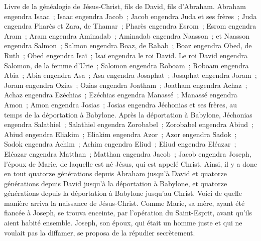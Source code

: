 \begin{multicols}{2}
\VerseOne{}Livre de la généalogie de Jésus-Christ, fils de David, fils d'Abraham.
Abraham engendra Isaac~; Isaac engendra Jacob~; Jacob engendra Juda et ses frères~;
Juda engendra Pharès et Zara, de Thamar~; Pharès engendra Esrom~; Esrom engendra Aram~;
Aram engendra Aminadab~; Aminadab engendra Naasson~; et Naasson engendra Salmon~;
Salmon engendra Boaz, de Rahab~; Boaz engendra Obed, de Ruth~; Obed engendra Isaï~;
Isaï engendra le roi David. Le roi David engendra Salomon, de la femme d'Urie~;
Salomon engendra Roboam~; Roboam engendra Abia~; Abia engendra Asa~;
Asa engendra Josaphat~; Josaphat engendra Joram~; Joram engendra Ozias~;
Ozias engendra Joatham~; Joatham engendra Achaz~; Achaz engendra Ezéchias~;
Ezéchias engendra Manassé~; Manassé engendra Amon~; Amon engendra Josias~;
Josias engendra Jéchonias et ses frères, au temps de la déportation à Babylone.
Après la déportation à Babylone, Jéchonias engendra Salathiel~; Salathiel engendra Zorobabel~;
Zorobabel engendra Abiud~; Abiud engendra Eliakim~; Eliakim engendra Azor~;
Azor engendra Sadok~; Sadok engendra Achim~; Achim engendra Eliud~;
Eliud engendra Eléazar~; Eléazar engendra Matthan~; Matthan engendra Jacob~;
Jacob engendra Joseph, l'époux de Marie, de laquelle est né Jésus, qui est appelé Christ.
Ainsi, il y a donc en tout quatorze générations depuis Abraham jusqu'à David et quatorze générations depuis David jusqu'à la déportation à Babylone, et quatorze générations depuis la déportation à Babylone jusqu'au Christ.
Voici de quelle manière arriva la naissance de Jésus-Christ. Comme Marie, sa mère, ayant été fiancée à Joseph, se trouva enceinte, par l'opération du Saint-Esprit, avant qu'ils aient habité ensemble.
Joseph, son époux, qui était un homme juste et qui ne voulait pas la diffamer, se proposa de la répudier secrètement.

\end{multicols}
